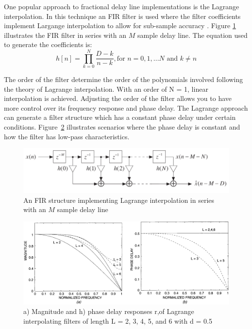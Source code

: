 \documentclass[main.tex]{subfiles}
\begin{document}
One popular approach to fractional delay line implementations is the Lagrange interpolation. In this technique an FIR filter is used where the filter coefficients implement Largange interpolation to allow for sub-sample accuracy . Figure \ref{fig:LagrangeStructure} illustrates the FIR filter in series with an $M$ sample delay line. The equation used to generate the coefficients is:
\begin{equation}
    h[n] = \prod_{k=0}^{N} \frac{D-k}{n-k}, \text{for } n=0, 1, ... N \text{ and } k \ne n
\end{equation}

The order of the filter determine the order of the polynomials involved following the theory of Lagrange interpolation. With an order of N = 1, linear interpolation is achieved. Adjusting the order of the filter allows you to have more control over its frequency response and phase delay. The Lagrange approach can generate a filter structure which has a constant phase delay under certain conditions. Figure~\ref{fig:LagrangeResponses} illustrates scenarios where the phase delay is constant and how the filter has low-pass characteristics.

\begin{figure}[h]
    \centering
    \includegraphics[scale=.65]{./images/diagrams/LagrangeStructure.png}
    \caption{An FIR structure implementing Lagrange interpolation in series with an $M$ sample delay line }
    \label{fig:LagrangeStructure}
\end{figure}

\begin{figure}[h]
    \centering
    \includegraphics[scale=.65]{./images/plots/LagrangeResponses.png}
    \caption{a) Magnitude and h) phase delay responses r,of Lagrange interpolating filters of length L = 2, 3, 4, 5, and 6 with d = 0.5 }
    \label{fig:LagrangeResponses}
\end{figure}
\end{document}
